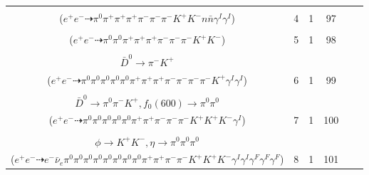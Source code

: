 \documentclass[landscape]{article}
\newcounter{rownumbers}
\newcommand\rn{\stepcounter{rownumbers}\arabic{rownumbers}}
\newcommand{\EOLP}{\\ \hline} %
\newcommand{\topoTags}[1]{#1} %
\begin{document}
\begin{longtable}{clcccc}
\rn & \makecell[l]{ $ 
e^{+} e^{-} \rightarrow \pi^{-} D^{+} \bar{D}^{0} n \bar{n} \gamma^{I} \gamma^{I} ,
D^{+} \rightarrow \pi^{0} \pi^{+} K_{S}^{0} ,
\bar{D}^{0} \rightarrow K_{S}^{0} K^{+} K^{-} ,
K_{S}^{0} \rightarrow \pi^{+} \pi^{-} ,
K_{S}^{0} \rightarrow \pi^{+} \pi^{-} 
$ \\ ($
e^{+} e^{-} \dashrightarrow \pi^{0} \pi^{+} \pi^{+} \pi^{+} \pi^{-} \pi^{-} \pi^{-} K^{+} K^{-} n \bar{n} \gamma^{I} \gamma^{I} 
$) } & \topoTags{4 & }1 & 97 \EOLP

\rn & \makecell[l]{ $ 
e^{+} e^{-} \rightarrow \pi^{+} \pi^{-} \pi^{-} D^{*+} \bar{D}^{0} ,
D^{*+} \rightarrow \pi^{+} D^{0} ,
\bar{D}^{0} \rightarrow K^{+} a_{1}^{-} ,
D^{0} \rightarrow \pi^{+} K^{-} ,
a_{1}^{-} \rightarrow \pi^{0} \rho^{-}(1450) ,
\rho^{-}(1450) \rightarrow \pi^{0} \pi^{-} 
$ \\ ($
e^{+} e^{-} \dashrightarrow \pi^{0} \pi^{0} \pi^{+} \pi^{+} \pi^{+} \pi^{-} \pi^{-} \pi^{-} K^{+} K^{-} 
$) } & \topoTags{5 & }1 & 98 \EOLP

\rn & \makecell[l]{ $ 
e^{+} e^{-} \rightarrow \pi^{0} \pi^{-} \rho^{+} \rho^{-} D^{*+} \bar{D}^{*0} \gamma^{I} \gamma^{I} ,
\rho^{+} \rightarrow \pi^{0} \pi^{+} ,
\rho^{-} \rightarrow \pi^{0} \pi^{-} ,
D^{*+} \rightarrow \pi^{+} D^{0} ,
\bar{D}^{*0} \rightarrow \pi^{0} \bar{D}^{0} ,
D^{0} \rightarrow \pi^{0} \pi^{+} \pi^{-} ,
$ \\ $
\bar{D}^{0} \rightarrow \pi^{-} K^{+} 
$ \\ ($
e^{+} e^{-} \dashrightarrow \pi^{0} \pi^{0} \pi^{0} \pi^{0} \pi^{0} \pi^{+} \pi^{+} \pi^{+} \pi^{-} \pi^{-} \pi^{-} \pi^{-} K^{+} \gamma^{I} \gamma^{I} 
$) } & \topoTags{6 & }1 & 99 \EOLP

\rn & \makecell[l]{ $ 
e^{+} e^{-} \rightarrow \pi^{0} \pi^{-} \bar{K}^{0} K^{+} D^{0} \bar{D}^{*0} \gamma^{I} ,
\bar{K}^{0} \rightarrow K_{S}^{0} ,
D^{0} \rightarrow K^{-} a_{1}^{+} ,
\bar{D}^{*0} \rightarrow \pi^{0} \bar{D}^{0} ,
K_{S}^{0} \rightarrow \pi^{+} \pi^{-} ,
a_{1}^{+} \rightarrow \pi^{+} f_{0}(600) ,
$ \\ $
\bar{D}^{0} \rightarrow \pi^{0} \pi^{-} K^{+} ,
f_{0}(600) \rightarrow \pi^{0} \pi^{0} 
$ \\ ($
e^{+} e^{-} \dashrightarrow \pi^{0} \pi^{0} \pi^{0} \pi^{0} \pi^{0} \pi^{+} \pi^{+} \pi^{-} \pi^{-} \pi^{-} K^{+} K^{+} K^{-} \gamma^{I} 
$) } & \topoTags{7 & }1 & 100 \EOLP

\rn & \makecell[l]{ $ 
e^{+} e^{-} \rightarrow \pi^{+} \rho^{-} \omega K^{+} D^{*0} D_{s}^{-} \gamma^{I} \gamma^{I} ,
\rho^{-} \rightarrow \pi^{0} \pi^{-} ,
\omega \rightarrow \pi^{0} \pi^{+} \pi^{-} ,
D^{*0} \rightarrow \pi^{0} D^{0} ,
D_{s}^{-} \rightarrow e^{-} \bar{\nu}_{e} \phi \gamma^{F} \gamma^{F} \gamma^{F} ,
D^{0} \rightarrow \pi^{0} \pi^{0} \eta ,
$ \\ $
\phi \rightarrow K^{+} K^{-} ,
\eta \rightarrow \pi^{0} \pi^{0} \pi^{0} 
$ \\ ($
e^{+} e^{-} \dashrightarrow e^{-} \bar{\nu}_{e} \pi^{0} \pi^{0} \pi^{0} \pi^{0} \pi^{0} \pi^{0} \pi^{0} \pi^{0} \pi^{+} \pi^{+} \pi^{-} \pi^{-} K^{+} K^{+} K^{-} \gamma^{I} \gamma^{I} \gamma^{F} \gamma^{F} \gamma^{F} 
$) } & \topoTags{8 & }1 & 101 \EOLP


\end{longtable}
\end{document}
